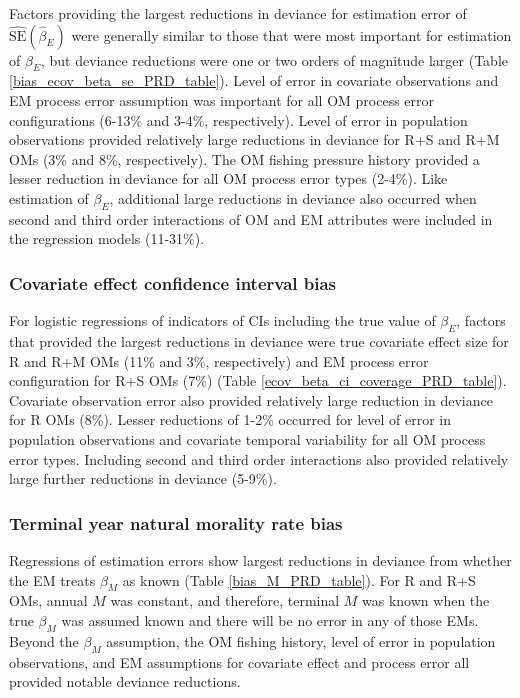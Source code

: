 \documentclass[
  12pt,
]{article}
\begin{document}
Factors providing the largest reductions in deviance for estimation
error of \(\widehat {\text{SE}}\left(\widehat\beta_E\right)\) were
generally similar to those that were most important for estimation of
\(\beta_E\), but deviance reductions were one or two orders of magnitude
larger (Table \ref{bias_ecov_beta_se_PRD_table}). Level of error in
covariate observations and EM process error assumption was important for
all OM process error configurations (6-13\% and 3-4\%, respectively).
Level of error in population observations provided relatively large
reductions in deviance for R+S and R+M OMs (3\% and 8\%, respectively).
The OM fishing pressure history provided a lesser reduction in deviance
for all OM process error types (2-4\%). Like estimation of \(\beta_E\),
additional large reductions in deviance also occurred when second and
third order interactions of OM and EM attributes were included in the
regression models (11-31\%).

\subsubsection*{Covariate effect confidence interval
bias}\label{covariate-effect-confidence-interval-bias}

For logistic regressions of indicators of CIs including the true value
of \(\beta_E\), factors that provided the largest reductions in deviance
were true covariate effect size for R and R+M OMs (11\% and 3\%,
respectively) and EM process error configuration for R+S OMs (7\%)
(Table \ref{ecov_beta_ci_coverage_PRD_table}). Covariate observation
error also provided relatively large reduction in deviance for R OMs
(8\%). Lesser reductions of 1-2\% occurred for level of error in
population observations and covariate temporal variability for all OM
process error types. Including second and third order interactions also
provided relatively large further reductions in deviance (5-9\%).

\subsubsection*{Terminal year natural morality rate
bias}\label{terminal-year-natural-morality-rate-bias}

Regressions of estimation errors show largest reductions in deviance
from whether the EM treats \(\beta_M\) as known (Table
\ref{bias_M_PRD_table}). For R and R+S OMs, annual \(M\) was constant,
and therefore, terminal \(M\) was known when the true \(\beta_M\) was
assumed known and there will be no error in any of those EMs. Beyond the
\(\beta_M\) assumption, the OM fishing history, level of error in
population observations, and EM assumptions for covariate effect and
process error all provided notable deviance reductions.
\end{document}
